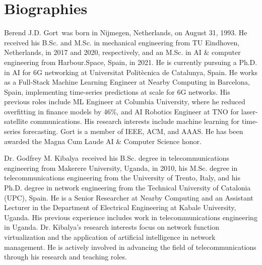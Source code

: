 \documentclass{ieeetmlcn}
\begin{document}

\section*{Biographies}

\begin{IEEEbiography}
{Berend J.D. Gort}~was born in Nijmegen, Netherlands, on August 31, 1993. He received his B.Sc. and M.Sc. in mechanical engineering from TU Eindhoven, Netherlands, in 2017 and 2020, respectively, and an M.Sc. in AI \& computer engineering from Harbour.Space, Spain, in 2021. He is currently pursuing a Ph.D. in AI for 6G networking at Universitat Politècnica de Catalunya, Spain. He works as a Full-Stack Machine Learning Engineer at Nearby Computing in Barcelona, Spain, implementing time-series predictions at scale for 6G networks. His previous roles include ML Engineer at Columbia University, where he reduced overfitting in finance models by 46\%, and AI Robotics Engineer at TNO for laser-satellite communications. His research interests include machine learning for time-series forecasting. Gort is a member of IEEE, ACM, and AAAS. He has been awarded the Magna Cum Laude AI \& Computer Science honor.
\end{IEEEbiography}%


\begin{IEEEbiography}
{Dr. Godfrey M. Kibalya}~received his B.Sc. degree in telecommunications engineering from Makerere University, Uganda, in 2010, his M.Sc. degree in telecommunications engineering from the University of Trento, Italy, and his Ph.D. degree in network engineering from the Technical University of Catalonia (UPC), Spain. He is a Senior Researcher at Nearby Computing and an Assistant Lecturer in the Department of Electrical Engineering at Kabale University, Uganda. His previous experience includes work in telecommunications engineering in Uganda. Dr. Kibalya's research interests focus on network function virtualization and the application of artificial intelligence in network management. He is actively involved in advancing the field of telecommunications through his research and teaching roles.
\end{IEEEbiography}%
\end{document}
